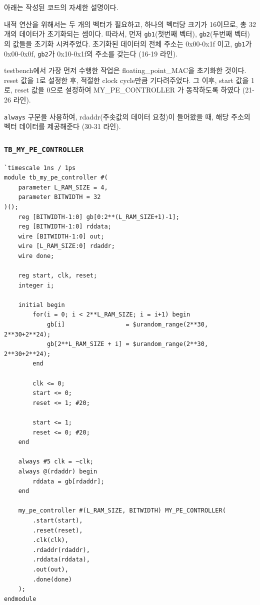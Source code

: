 \documentclass{article}
\begin{document}
아래는 작성된 코드의 자세한 설명이다.
\begin{itemize*}
\item 내적 연산을 위해서는 두 개의 벡터가 필요하고, 하나의 벡터당 크기가 16이므로, 총 32개의 데이터가 초기화되는 셈이다. 따라서, 먼저 \texttt{gb1}(첫번째 벡터), \texttt{gb2}(두번째 벡터)의 값들을 초기화 시켜주었다. 초기화된 데이터의 전체 주소는 0x00-0x1f 이고, \texttt{gb1}가 0x00-0x0f, \texttt{gb2}가 0x10-0x1f의 주소를 갖는다 (16-19 라인).\\

\item testbench에서 가장 먼저 수행한 작업은 floating\_point\_MAC을 초기화한 것이다. reset 값을 1로 설정한 후, 적절한 clock cycle만큼 기다려주었다. 그 이후, start 값을 1로, reset 값을 0으로 설정하여 MY\_PE\_CONTROLLER 가 동작하도록 하였다 (21-26 라인).\\

\item \texttt{always} 구문을 사용하여, rdaddr(주솟값의 데이터 요청)이 들어왔을 때, 해당 주소의  벡터 데이터를 제공해준다 (30-31 라인).
\end{itemize*}

\subsubsection*{\texttt{TB\_MY\_PE\_CONTROLLER}}
\begin{lstlisting}[style={verilog-style}]
`timescale 1ns / 1ps
module tb_my_pe_controller #(
    parameter L_RAM_SIZE = 4,
    parameter BITWIDTH = 32
)();
    reg [BITWIDTH-1:0] gb[0:2**(L_RAM_SIZE+1)-1];
    reg [BITWIDTH-1:0] rddata;
    wire [BITWIDTH-1:0] out;
    wire [L_RAM_SIZE:0] rdaddr;
    wire done;
    
    reg start, clk, reset;
    integer i;
    
    initial begin
        for(i = 0; i < 2**L_RAM_SIZE; i = i+1) begin
            gb[i]                 = $urandom_range(2**30, 2**30+2**24);
            gb[2**L_RAM_SIZE + i] = $urandom_range(2**30, 2**30+2**24);
        end
    
        clk <= 0;
        start <= 0;
        reset <= 1; #20;
        
        start <= 1;
        reset <= 0; #20;
    end
    
    always #5 clk = ~clk;
    always @(rdaddr) begin
        rddata = gb[rdaddr];
    end
    
    my_pe_controller #(L_RAM_SIZE, BITWIDTH) MY_PE_CONTROLLER(
        .start(start),
        .reset(reset),
        .clk(clk),
        .rdaddr(rdaddr),
        .rddata(rddata),
        .out(out),
        .done(done)
    );
endmodule
\end{lstlisting}
\end{document}
